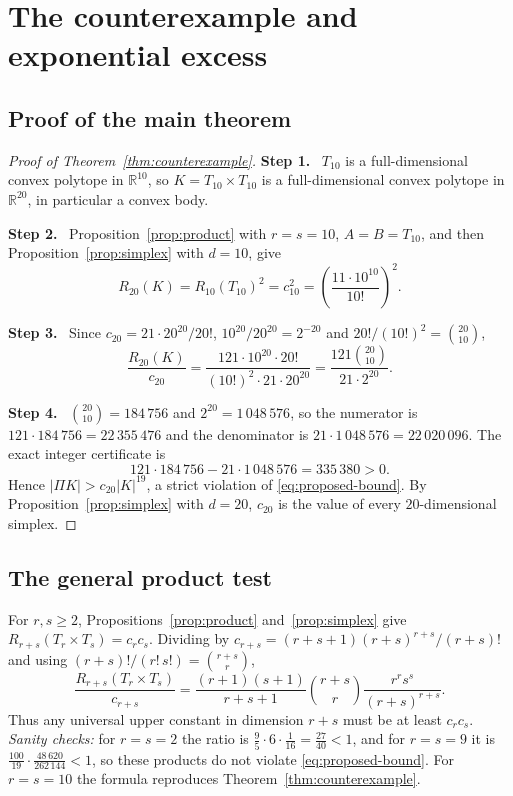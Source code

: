 \documentclass[11pt]{article}
\newcommand{\R}{\mathbb R}
\newcommand{\step}[1]{\par\smallskip\noindent\textbf{#1}\ }
\begin{document}
\section{The counterexample and exponential excess}\label{sec:counterexample}

\subsection{Proof of the main theorem}

\begin{proof}[Proof of Theorem~\ref{thm:counterexample}]
\step{Step 1.} \(T_{10}\) is a full-dimensional convex polytope in
\(\R^{10}\), so \(K=T_{10}\times T_{10}\) is a full-dimensional convex
polytope in \(\R^{20}\), in particular a convex body.

\step{Step 2.} Proposition~\ref{prop:product} with \(r=s=10\),
\(A=B=T_{10}\), and then Proposition~\ref{prop:simplex} with \(d=10\),
give
\[
 R_{20}(K)=R_{10}(T_{10})^2=c_{10}^2
         =\left(\frac{11\cdot10^{10}}{10!}\right)^2.
\]

\step{Step 3.} Since \(c_{20}=21\cdot20^{20}/20!\),
\(10^{20}/20^{20}=2^{-20}\) and \(20!/(10!)^2=\binom{20}{10}\),
\[
 \frac{R_{20}(K)}{c_{20}}
 =\frac{121\cdot10^{20}\cdot20!}
        {(10!)^2\cdot21\cdot20^{20}}
 =\frac{121\binom{20}{10}}{21\cdot2^{20}}.
\]

\step{Step 4.} \(\binom{20}{10}=184\,756\) and \(2^{20}=1\,048\,576\),
so the numerator is \(121\cdot184\,756=22\,355\,476\) and the
denominator is \(21\cdot1\,048\,576=22\,020\,096\). The exact integer
certificate is
\[
 121\cdot184\,756-21\cdot1\,048\,576=335\,380>0.
\]
Hence \(|\Pi K|>c_{20}|K|^{19}\), a strict violation of
\eqref{eq:proposed-bound}. By Proposition~\ref{prop:simplex} with
\(d=20\), \(c_{20}\) is the value of every \(20\)-dimensional simplex.
\end{proof}

\subsection{The general product test}

For \(r,s\ge2\), Propositions~\ref{prop:product} and~\ref{prop:simplex}
give \(R_{r+s}(T_r\times T_s)=c_rc_s\). Dividing by
\(c_{r+s}=(r+s+1)(r+s)^{r+s}/(r+s)!\) and using
\((r+s)!/(r!\,s!)=\binom{r+s}{r}\),
\[
 \frac{R_{r+s}(T_r\times T_s)}{c_{r+s}}
 =\frac{(r+1)(s+1)}{r+s+1}
   \binom{r+s}{r}\frac{r^rs^s}{(r+s)^{r+s}}.
\]
Thus any universal upper constant in dimension \(r+s\) must be at least
\(c_rc_s\). \emph{Sanity checks:} for \(r=s=2\) the ratio is
\(\tfrac95\cdot6\cdot\tfrac1{16}=\tfrac{27}{40}<1\), and for \(r=s=9\)
it is \(\tfrac{100}{19}\cdot\tfrac{48\,620}{262\,144}<1\), so these
products do not violate \eqref{eq:proposed-bound}. For \(r=s=10\) the
formula reproduces Theorem~\ref{thm:counterexample}.
\end{document}
